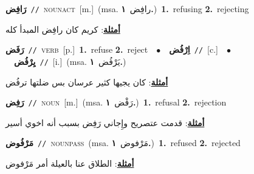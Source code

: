 \documentclass[10pt,a4paper,twoside]{article} %
\begin{document}
\begin{multicols}{2}
{\setlength\topsep{0pt}\textbf{\foreignlanguage{arabic}{رَافِض}}\ {\color{gray}\texttt{//}\color{black}}\ \textsc{noun\textunderscore act}\ [m.]\ \color{gray}(msa. \foreignlanguage{arabic}{رافِض}~\foreignlanguage{arabic}{\textbf{١.}})\color{black}\ \textbf{1.}~refusing  \textbf{2.}~rejecting\  \begin{flushright}\color{gray}\foreignlanguage{arabic}{\textbf{\underline{\foreignlanguage{arabic}{أمثلة}}}: كريم كان رافِض المبدأ كله}\end{flushright}\color{black}} \vspace{2mm}

{\setlength\topsep{0pt}\textbf{\foreignlanguage{arabic}{رَفَض}}\ {\color{gray}\texttt{//}\color{black}}\ \textsc{verb}\ [p.]\ \textbf{1.}~refuse  \textbf{2.}~reject\ \ $\bullet$\ \ \setlength\topsep{0pt}\textbf{\foreignlanguage{arabic}{اِرْفُض}}\ {\color{gray}\texttt{//}\color{black}}\ [c.]\ \ $\bullet$\ \ \setlength\topsep{0pt}\textbf{\foreignlanguage{arabic}{يِرْفُض}}\ {\color{gray}\texttt{//}\color{black}}\ [i.]\ \color{gray}(msa. \foreignlanguage{arabic}{يَرْفُض}~\foreignlanguage{arabic}{\textbf{١.}})\color{black}\  \begin{flushright}\color{gray}\foreignlanguage{arabic}{\textbf{\underline{\foreignlanguage{arabic}{أمثلة}}}: كان يجيها كثير عرسان بس ضلتها ترفُض}\end{flushright}\color{black}} \vspace{2mm}

{\setlength\topsep{0pt}\textbf{\foreignlanguage{arabic}{رَفِض}}\ {\color{gray}\texttt{//}\color{black}}\ \textsc{noun}\ [m.]\ \color{gray}(msa. \foreignlanguage{arabic}{رَفْض}~\foreignlanguage{arabic}{\textbf{١.}})\color{black}\ \textbf{1.}~refusal  \textbf{2.}~rejection\  \begin{flushright}\color{gray}\foreignlanguage{arabic}{\textbf{\underline{\foreignlanguage{arabic}{أمثلة}}}: قدمت عتصريح وإِجاني رَفِض بسبب أنه اخوي أسير}\end{flushright}\color{black}} \vspace{2mm}

{\setlength\topsep{0pt}\textbf{\foreignlanguage{arabic}{مَرْفُوض}}\ {\color{gray}\texttt{//}\color{black}}\ \textsc{noun\textunderscore pass}\ \color{gray}(msa. \foreignlanguage{arabic}{مَرْفوض}~\foreignlanguage{arabic}{\textbf{١.}})\color{black}\ \textbf{1.}~refused  \textbf{2.}~rejected\  \begin{flushright}\color{gray}\foreignlanguage{arabic}{\textbf{\underline{\foreignlanguage{arabic}{أمثلة}}}: الطلاق عنا بالعيلة أمر مَرْفوض}\end{flushright}\color{black}} \vspace{2mm}


\end{multicols}
\end{document}
